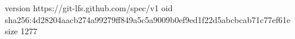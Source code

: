 version https://git-lfs.github.com/spec/v1
oid sha256:4d28204aacb274a99279ff849a5c5a9009b0ef9ed1f22d5abcbcab71c77ef61e
size 1277
